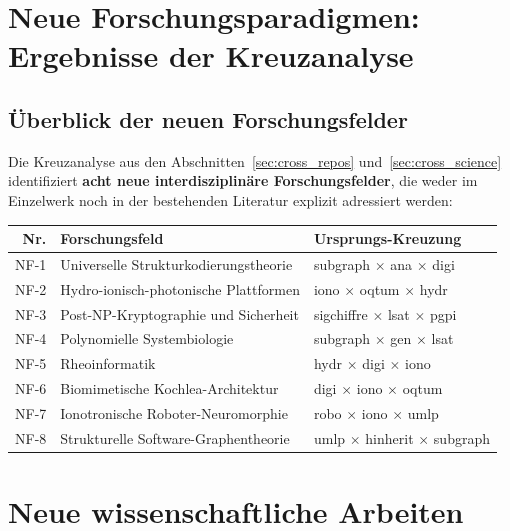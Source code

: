 ﻿\documentclass[a4paper,12pt]{scrreprt}
\theoremstyle{definition}
\begin{document}
\section{Neue Forschungsparadigmen:  \\
  Ergebnisse der Kreuzanalyse}
\label{sec:paradigmen}

\subsection{Überblick der neuen Forschungsfelder}

Die Kreuzanalyse aus den Abschnitten~\ref{sec:cross_repos} und~\ref{sec:cross_science}
identifiziert \textbf{acht neue interdisziplinäre Forschungsfelder}, die weder
im Einzelwerk noch in der bestehenden Literatur explizit adressiert werden:

\begin{center}
\begin{tabular}{rll}
\toprule
\textbf{Nr.} & \textbf{Forschungsfeld} & \textbf{Ursprungs-Kreuzung} \\
\midrule
NF-1 & Universelle Strukturkodierungstheorie & subgraph $\times$ ana $\times$ digi \\
NF-2 & Hydro-ionisch-photonische Plattformen & iono $\times$ oqtum $\times$ hydr \\
NF-3 & Post-NP-Kryptographie und Sicherheit   & sigchiffre $\times$ lsat $\times$ pgpi \\
NF-4 & Polynomielle Systembiologie            & subgraph $\times$ gen $\times$ lsat \\
NF-5 & Rheoinformatik                         & hydr $\times$ digi $\times$ iono \\
NF-6 & Biomimetische Kochlea-Architektur      & digi $\times$ iono $\times$ oqtum \\
NF-7 & Ionotronische Roboter-Neuromorphie     & robo $\times$ iono $\times$ umlp \\
NF-8 & Strukturelle Software-Graphentheorie   & umlp $\times$ hinherit $\times$ subgraph \\
\bottomrule
\end{tabular}
\end{center}

\section{Neue wissenschaftliche Arbeiten}
\label{sec:neue_arbeiten}
\end{document}
